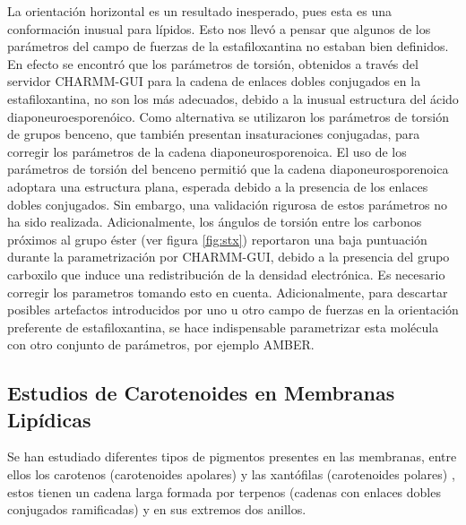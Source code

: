 La orientaci\'{o}n horizontal es un resultado inesperado, pues esta es una conformaci\'{o}n inusual para l\'{i}pidos. Esto nos llev\'{o} a pensar que algunos de los par\'{a}metros del campo de fuerzas de la estafiloxantina no estaban bien definidos. En efecto se encontr\'{o} que los par\'{a}metros de torsi\'{o}n, obtenidos a trav\'{e}s del servidor CHARMM-GUI para la cadena de enlaces dobles conjugados en la estafiloxantina, no son los m\'{a}s adecuados, debido a la inusual estructura del \'{a}cido diaponeuroesporen\'{o}ico. Como alternativa se utilizaron los par\'{a}metros de torsi\'{o}n de grupos benceno, que tambi\'{e}n presentan insaturaciones conjugadas, para corregir los par\'{a}metros de la cadena diaponeurosporenoica. El uso de los par\'{a}metros de torsi\'{o}n del benceno permiti\'{o} que la cadena diaponeurosporenoica adoptara una estructura plana, esperada debido a la presencia de los enlaces dobles conjugados. Sin embargo, una validaci\'{o}n rigurosa de estos par\'{a}metros no ha sido realizada. Adicionalmente, los \'{a}ngulos de torsi\'{o}n entre los carbonos pr\'{o}ximos al grupo \'{e}ster (ver figura \ref{fig:stx}) reportaron una baja puntuaci\'{o}n durante la parametrizaci\'{o}n por CHARMM-GUI, debido a la presencia del grupo carboxilo que induce una redistribuci\'{o}n de la densidad electr\'{o}nica. Es necesario corregir los parametros tomando esto en cuenta. Adicionalmente, para descartar posibles artefactos introducidos por uno u otro campo de fuerzas en la orientaci\'{o}n preferente de estafiloxantina, se hace indispensable parametrizar esta mol\'{e}cula con otro conjunto de par\'{a}metros, por ejemplo AMBER.\\

\subsection{Estudios de Carotenoides en Membranas Lip\'{i}dicas}
Se han estudiado diferentes tipos de pigmentos presentes en las membranas, entre ellos los carotenos (carotenoides apolares) y las xant\'{o}filas (carotenoides polares) \cite{Gruszecki2004CarotenoidsProperties}, estos tienen un cadena larga formada por terpenos (cadenas con enlaces dobles conjugados ramificadas) y en sus extremos dos anillos.\\

